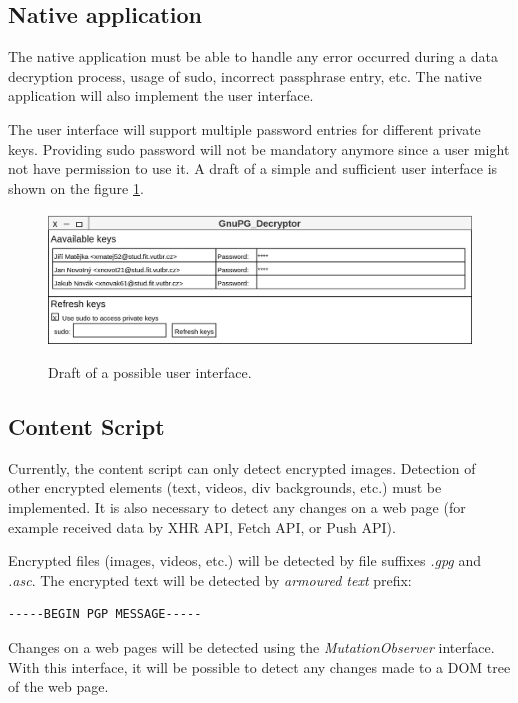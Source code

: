 \subsection{Native application}
The native application must be able to handle any error occurred during a data decryption process, usage of sudo, incorrect passphrase entry, etc. The native application will also implement the user interface.

The user interface will support multiple password entries for different private keys. Providing sudo password will not be mandatory anymore since a user might not have permission to use it. A draft of a simple and sufficient user interface is shown on the figure \ref{img:userInterfaceDesign}.

\begin{figure}[H]
    \begin{center}
        \label{img:userInterfaceDesign}
        \includegraphics[width=1.0\textwidth]{obrazky-figures/UI-design.png}
        \caption{Draft of a possible user interface.}
    \end{center}
\end{figure}

\subsection{Content Script}
Currently, the content script can only detect encrypted images. Detection of other encrypted elements (text, videos, div backgrounds, etc.) must be implemented. It is also necessary to detect any changes on a web page (for example received data by XHR API, Fetch API, or Push
API).

Encrypted files (images, videos, etc.) will be detected by file suffixes \textit{.gpg} and \textit{.asc}. The encrypted text will be detected by \textit{armoured text} prefix:
\begin{verbatim}
-----BEGIN PGP MESSAGE-----
\end{verbatim}

Changes on a web pages will be detected using the \textit{MutationObserver} interface. With this interface, it will be possible to detect any changes made to a DOM tree of the web page.

